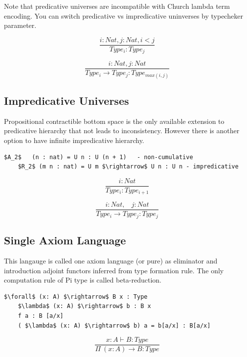 \documentclass[11pt,oneside]{article}
\begin{document}
Note that predicative universes are incompatible with Church lambda term encoding.
You can switch predicative vs impredicative uninverses by typecheker parameter.

\[
\tag{$A_1$}
\dfrac{i: Nat, j: Nat, i < j}{Type_i : Type_j}
\]

\[
\tag{$R_1$}
\dfrac{i : Nat, j : Nat}{Type_i \rightarrow Type_j : Type_{max(i,j)} }
\]

\subsection{Impredicative Universes}
Propositional contractible bottom space is the only
available extension to predicative hierarchy that not leads to inconsistency.
However there is another option to have infinite
impredicative hierarchy.

\vspace{0.5cm}
\begin{lstlisting}[mathescape=true]
    $A_2$   (n : nat) = U n : U (n + 1)   - non-cumulative
    $R_2$ (m n : nat) = U m $\rightarrow$ U n : U n - impredicative
\end{lstlisting}

\begin{equation}
\tag{$A_2$}
\dfrac
{i: Nat}
{Type_i : Type_{i+1}}
\end{equation}

\begin{equation}
\tag{$R_2$}
\dfrac
{i : Nat,\ \ \ \ j : Nat}
{Type_i \rightarrow Type_{j} : Type_{j}}
\end{equation}

\subsection{Single Axiom Language}

This langauge is called one axiom language (or pure) as eliminator
and introduction adjoint functors inferred from type formation rule.
The only computation rule of Pi type is called beta-reduction.

\begin{lstlisting}[mathescape=true]
    $\forall$ (x: A) $\rightarrow$ B x : Type
    $\lambda$ (x: A) $\rightarrow$ b : B x
    f a : B [a/x]
    ( $\lambda$ (x: A) $\rightarrow$ b) a = b[a/x] : B[a/x]

\end{lstlisting}


\begin{equation}
\tag{$\Pi$-formation}
\dfrac
{x:A \vdash B : Type}
{\Pi\ (x:A) \rightarrow B : Type}
\end{equation}
\end{document}
